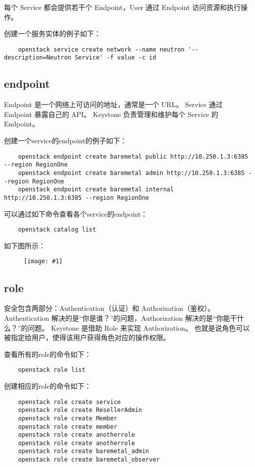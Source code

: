 \documentclass[a4paper,left=1.5cm,right=1.5cm,11pt]{article}
\newcommand{\fic}[1]{\begin{figure}[H]
		\center
		\texttt{[image: \#1]}
	\end{figure}}
\begin{document}
	每个 Service 都会提供若干个 Endpoint，User 通过 Endpoint 访问资源和执行操作。\par

	创建一个服务实体的例子如下：
	\begin{lstlisting}
	openstack service create network --name neutron '--description=Neutron Service' -f value -c id
	\end{lstlisting}

\subsection{endpoint}
	Endpoint 是一个网络上可访问的地址，通常是一个 URL。
	Service 通过 Endpoint 暴露自己的 API。 
	Keystone 负责管理和维护每个 Service 的 Endpoint。\par

	创建一个service的endpoint的例子如下：
	\begin{lstlisting}
	openstack endpoint create baremetal public http://10.250.1.3:6385 --region RegionOne
	openstack endpoint create baremetal admin http://10.250.1.3:6385 --region RegionOne
	openstack endpoint create baremetal internal http://10.250.1.3:6385 --region RegionOne
	\end{lstlisting}

	可以通过如下命令查看各个service的endpoint：
	\begin{lstlisting}
	openstack catalog list
	\end{lstlisting}

	如下图所示：
	\fic{1.png}

\subsection{role}
	安全包含两部分：Authentication（认证）和 Authorization（鉴权）。
	Authentication 解决的是“你是谁？”的问题，Authorization 解决的是“你能干什么？”的问题。
	Keystone 是借助 Role 来实现 Authorization。
	也就是说角色可以被指定给用户，使得该用户获得角色对应的操作权限。\par

	查看所有的role的命令如下：
	\begin{lstlisting}
	openstack role list
	\end{lstlisting}

	创建相应的role的命令如下：
	\begin{lstlisting}
	openstack role create service
	openstack role create ResellerAdmin
	openstack role create Member
	openstack role create member
	openstack role create anotherrole
	openstack role create anotherrole
	openstack role create baremetal_admin
	openstack role create baremetal_observer
	\end{lstlisting}
\end{document}
